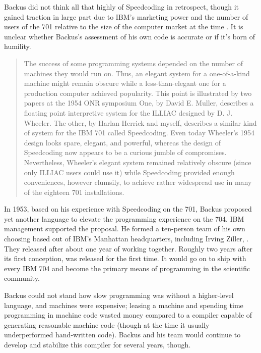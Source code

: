 Backus did not think all that highly of Speedcoding in retrospect, though it
gained traction in large part due to IBM's marketing power and the number of
users of the 701 relative to the size of the computer market at the time
\cite{Backus_1980_Programming_in_America_in_1950s}. It is unclear whether
Backus's assessment of his own code is accurate or if it's born of humility.

\begin{quotation}
	The success of some programming systems depended on the number of machines
	they would run on. Thus, an elegant system for a one-of-a-kind machine might
	remain obscure while a less-than-elegant one for a production
	computer achieved popularity.
	This point is illustrated by two papers at the 1954 ONR symposium
	One, by David E. Muller, describes a floating point interpretive system for
	the ILLIAC designed by D. J. Wheeler. The other, by Harlan Herrick and myself,
	describes a similar kind of system for the IBM 701 called Speedcoding. Even
	today Wheeler's 1954 design looks spare, elegant, and powerful, whereas the
	design of Speedcoding now appears to be a curious jumble of compromises.
	Nevertheless, Wheeler's elegant system remained relatively obscure (since only
	ILLIAC users could use it) while Speedcoding provided enough conveniences,
	however clumsily, to achieve rather widespread use in many of the eighteen 701
	installations.
\end{quotation}

In 1953, based on his experience with Speedcoding on the 701, Backus proposed
yet another language to elevate the programming experience on the 704. IBM
management supported the proposal. He formed a ten-person team of his own
choosing based out of IBM's Manhattan headquarters, including Irving Ziller,
. They released 
after about one year of working
together.
Roughly two years after its first conception, \FTN{} was released for
the first time. It would go on to ship with every IBM 704 and become the
primary means of programming in the scientific community.

Backus could not
stand how slow programming was without a higher-level language, and machines
were expensive; leasing a machine and spending time programming in machine code
wasted money compared to a compiler capable of generating reasonable machine
code (though at the time it usually underperformed hand-written code). Backus
and his team would continue to develop and stabilize this compiler for several
years, though.

